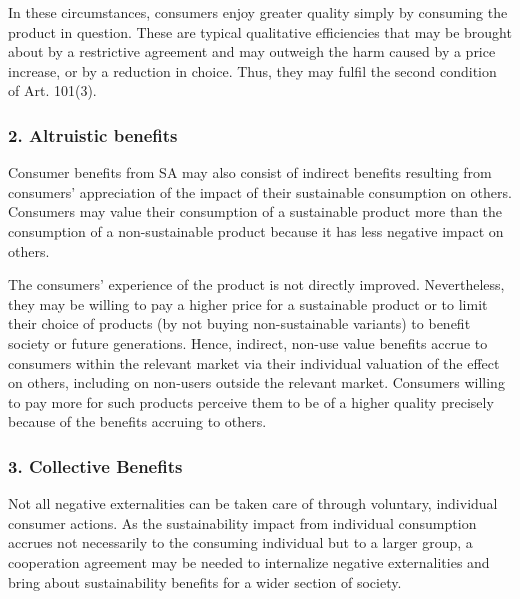             In these circumstances, consumers enjoy greater quality simply by consuming the product in question. These are typical qualitative efficiencies that may be brought about by a restrictive agreement and may outweigh the harm caused by a price increase, or by a reduction in choice.  
            Thus, they may fulfil the second condition of Art. 101(3).

        \subsubsection{2. Altruistic benefits}

            Consumer benefits from SA may also consist of indirect benefits resulting from consumers' appreciation of the impact of their sustainable consumption on others.  
            Consumers may value their consumption of a sustainable product more than the consumption of a non-sustainable product because it has less negative impact on others.
            
            
            
            The consumers' experience of the product is not directly improved. Nevertheless, they may be willing to pay a higher price for a sustainable product or to limit their choice of products (by not buying non-sustainable variants) to benefit society or future generations. Hence, indirect, non-use value benefits accrue to consumers within the relevant market via their individual valuation of the effect on others, including on non-users outside the relevant market.  
            Consumers willing to pay more for such products perceive them to be of a higher quality precisely because of the benefits accruing to others.

        \subsubsection{3. Collective Benefits}

            Not all negative externalities can be taken care of through voluntary, individual consumer actions.  
            As the sustainability impact from individual consumption accrues not necessarily to the consuming individual but to a larger group, a cooperation agreement may be needed to internalize negative externalities and bring about sustainability benefits for a wider section of society.

